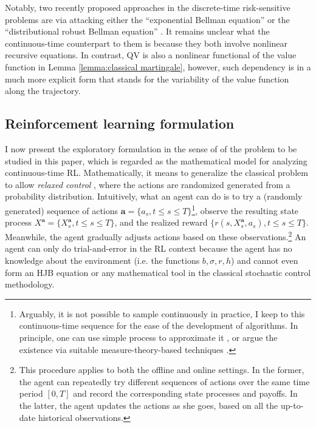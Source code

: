 Notably, two recently proposed approaches in the discrete-time risk-sensitive problems are via attacking either the ``exponential Bellman equation'' \citep{fei2021exponential} or the ``distributional robust Bellman equation'' \citep{wang2023finite}. It remains unclear what the continuous-time counterpart to them is because they both involve nonlinear recursive equations. In contrast, QV is also a nonlinear functional of the value function in Lemma \ref{lemma:classical martingale}, however, such dependency is in a much more explicit form that stands for the variability of the value function along the trajectory.





\subsection{Reinforcement learning formulation}
\label{sec:filtration discuss}
I now present the exploratory formulation in the sense of \citet{wang2020reinforcement} of the problem to be studied in this paper, which is regarded as the mathematical model for analyzing continuous-time RL. Mathematically, it means to generalize the classical problem to allow \textit{relaxed control} \citep{fleming1984stochastic,zhou1992existence}, where the actions are randomized generated from a probability distribution. Intuitively, what an agent can do is to try a (randomly generated) sequence of actions ${\bm a} = \{a_s,t\leq s \leq T\}$\footnote{Arguably, it is not possible to sample continuously in practice, I keep to this continuous-time sequence for the ease of the development of algorithms. In principle, one can use simple process to approximate it \citep{szpruch2022optimal}, or argue the existence via suitable measure-theory-based techniques \citep{sun2006exact}.}, observe the resulting state process $X^{\bm a} = \{X_s^{\bm a},t\leq s \leq T\}$, and the realized reward $\{r(s, X_s^{\bm a}, a_s),t\leq s \leq T\}$. Meanwhile, the agent gradually adjusts actions based on these observations.\footnote{This procedure applies to both the offline and online settings.  In the former, the agent can repeatedly try different sequences of actions over the same time period $[0,T]$ and record the corresponding state processes and payoffs. In the latter, the agent updates the actions as she goes, based on all the up-to-date historical observations.} An agent can only do trial-and-error in the RL context because the agent has no knowledge about the environment (i.e. the functions $b,\sigma,r,h$) and cannot even form an HJB equation or any mathematical tool in the classical stochastic control methodology.



